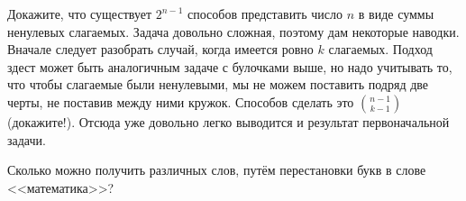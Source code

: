 \begin{exercise}
Докажите, что существует $2^{n-1}$ способов представить число $n$ в виде суммы ненулевых слагаемых. Задача довольно сложная, поэтому дам некоторые наводки. Вначале следует разобрать случай, когда имеется ровно $k$ слагаемых. Подход здест может быть аналогичным задаче с булочками выше, но надо учитывать то, что чтобы слагаемые были ненулевыми, мы не можем поставить подряд две черты, не поставив между ними кружок. Способов сделать это $n-1\choose k -1$ (докажите!). Отсюда уже довольно легко выводится и результат первоначальной задачи.
\end{exercise}

\begin{exercise}
Сколько можно получить различных слов, путём перестановки букв в слове <<математика>>?
\end{exercise}
